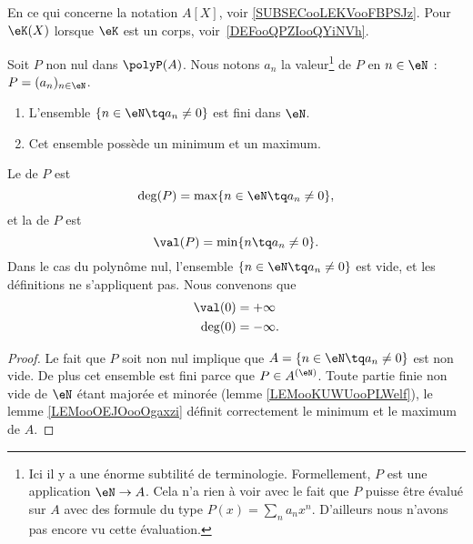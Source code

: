 \begin{normaltext}
    En ce qui concerne la notation \( A[X]\), voir \ref{SUBSECooLEKVooFBPSJz}. Pour \( \eK(X)\) lorsque \( \eK\) est un corps, voir~\ref{DEFooQPZIooQYiNVh}.
\end{normaltext}

\begin{propositionDef}  \label{DefDegrePoly}
    Soit \( P\) non nul dans \(\polyP(A)\). Nous notons \( a_n\) la valeur\footnote{Ici il y a une énorme subtilité de terminologie. Formellement, \( P\) est une application \( \eN\to A\). Cela n'a rien à voir avec le fait que \( P\) puisse être évalué sur \( A\) avec des formule du type \( P(x)=\sum_na_nx^n\). D'ailleurs nous n'avons pas encore vu cette évaluation.} de \( P\) en \( n\in \eN\) : \( P=(a_n)_{n\in \eN}\).
    \begin{enumerate}
        \item
            L'ensemble \( \{ n\in \eN\tq a_n\neq 0 \}\) est fini dans \( \eN\).
        \item
            Cet ensemble possède un minimum et un maximum.
    \end{enumerate}
    Le  de $P$ est
    \begin{equation}
        \deg(P)=\max\{ n\in \eN\tq a_n\neq 0 \},
    \end{equation}
    et la  de \( P\) est
    \begin{equation}
        \val(P)=\min\{ n\tq a_n\neq 0 \}.
    \end{equation}
    Dans le cas du polynôme nul, l'ensemble \( \{ n\in \eN\tq a_n\neq 0 \}\) est vide, et les définitions ne s'appliquent pas. Nous convenons que
    \begin{subequations}
        \begin{align}
            \val(0)&=+\infty\\           
            \deg(0)&=-\infty.
        \end{align}
    \end{subequations}
\end{propositionDef}

\begin{proof}
    Le fait que \( P\) soit non nul implique que \( A=\{ n\in \eN\tq a_n\neq 0 \}\) est non vide. De plus cet ensemble est fini parce que \( P\in A^{(\eN)}\). Toute partie finie non vide de \( \eN\) étant majorée et minorée (lemme \ref{LEMooKUWUooPLWelf}), le lemme \ref{LEMooOEJOooOgaxzi} définit correctement le minimum et le maximum de \( A\).
\end{proof}

